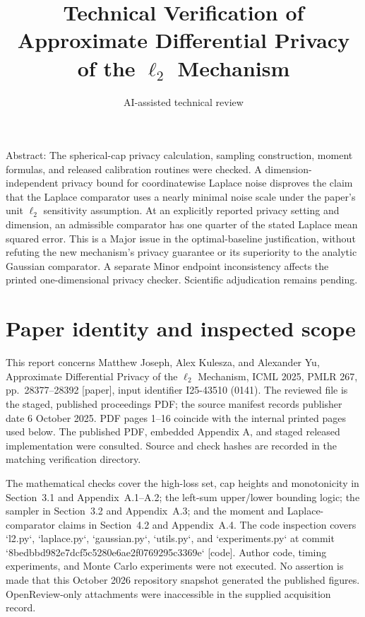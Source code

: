 \documentclass[10pt]{article}
\title{Technical Verification of
Approximate Differential Privacy of the \(\ell_2\) Mechanism}
\author{AI-assisted technical review}
\date{}
\begin{document}
\maketitle
Abstract: The spherical-cap privacy calculation, sampling construction, moment formulas, and released calibration routines were checked. A dimension-independent privacy bound for coordinatewise Laplace noise disproves the claim that the Laplace comparator uses a nearly minimal noise scale under the paper’s unit \(\ell_2\) sensitivity assumption. At an explicitly reported privacy setting and dimension, an admissible comparator has one quarter of the stated Laplace mean squared error. This is a Major issue in the optimal-baseline justification, without refuting the new mechanism’s privacy guarantee or its superiority to the analytic Gaussian comparator. A separate Minor endpoint inconsistency affects the printed one-dimensional privacy checker. Scientific adjudication remains pending.\par
\section*{Paper identity and inspected scope}
This report concerns Matthew Joseph, Alex Kulesza, and Alexander Yu, Approximate Differential Privacy of the \(\ell_2\) Mechanism, ICML 2025, PMLR 267, pp. 28377–28392 [paper], input identifier I25-43510 (0141). The reviewed file is the staged, published proceedings PDF; the source manifest records publisher date 6 October 2025. PDF pages 1–16 coincide with the internal printed pages used below. The published PDF, embedded Appendix A, and staged released implementation were consulted. Source and check hashes are recorded in the matching verification directory.\par
The mathematical checks cover the high-loss set, cap heights and monotonicity in Section 3.1 and Appendix A.1–A.2; the left-sum upper/lower bounding logic; the sampler in Section 3.2 and Appendix A.3; and the moment and Laplace-comparator claims in Section 4.2 and Appendix A.4. The code inspection covers `l2.py`, `laplace.py`, `gaussian.py`, `utils.py`, and `experiments.py` at commit `8bedbbd982e7dcf5c5280e6ae2f0769295c3369e` [code]. Author code, timing experiments, and Monte Carlo experiments were not executed. No assertion is made that this October 2026 repository snapshot generated the published figures. OpenReview-only attachments were inaccessible in the supplied acquisition record.\par
\end{document}
